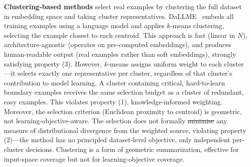 \documentclass[12pt, a4paper, twoside]{book}
\makeatletter
\numberwithin{equation}{chapter}
\theoremstyle{plain}
\theoremstyle{definition}
\theoremstyle{remark}
\newenvironment{foldable}{}{}
\providecommand{\DIFaddtex}[1]{{\protect\color{blue}\uwave{#1}}} %
\providecommand{\DIFdeltex}[1]{{\protect\color{red}\sout{#1}}} %
\providecommand{\DIFaddbegin}{} %
\providecommand{\DIFaddend}{} %
\providecommand{\DIFdelbegin}{} %
\providecommand{\DIFdelend}{} %
\providecommand{\DIFadd}[1]{\texorpdfstring{\DIFaddtex{#1}}{#1}} %
\providecommand{\DIFdel}[1]{\texorpdfstring{\DIFdeltex{#1}}{}} %
\newcommand{\DIFscaledelfig}{0.5}
\newlength{\DIFdelgraphicswidth} %
\newlength{\DIFdelgraphicsheight} %
\newcommand{\DIFaddincludegraphics}[2][]{{\color{blue}\fbox{\DIFOincludegraphics[#1]{#2}}}} %
\newcommand{\DIFdelincludegraphics}[2][]{%
\sbox{\DIFdelgraphicsbox}{\DIFOincludegraphics[#1]{#2}}%
\settoboxwidth{\DIFdelgraphicswidth}{\DIFdelgraphicsbox} %
\settoboxtotalheight{\DIFdelgraphicsheight}{\DIFdelgraphicsbox} %
\scalebox{\DIFscaledelfig}{%
\parbox[b]{\DIFdelgraphicswidth}{\usebox{\DIFdelgraphicsbox}\\[-\baselineskip] \rule{\DIFdelgraphicswidth}{0em}}\llap{\resizebox{\DIFdelgraphicswidth}{\DIFdelgraphicsheight}{%
\setlength{\unitlength}{\DIFdelgraphicswidth}%
\begin{picture}(1,1)%
\thicklines\linethickness{2pt} %
{\color[rgb]{1,0,0}\put(0,0){\framebox(1,1){}}}%
{\color[rgb]{1,0,0}\put(0,0){\line( 1,1){1}}}%
{\color[rgb]{1,0,0}\put(0,1){\line(1,-1){1}}}%
\end{picture}%
}\hspace*{3pt}}} %
} %
\DeclareRobustCommand{\DIFaddbegin}{\DIFOaddbegin \let\includegraphics\DIFaddincludegraphics} %
\DeclareRobustCommand{\DIFaddend}{\DIFOaddend \let\includegraphics\DIFOincludegraphics} %
\DeclareRobustCommand{\DIFdelbegin}{\DIFOdelbegin \let\includegraphics\DIFdelincludegraphics} %
\DeclareRobustCommand{\DIFdelend}{\DIFOaddend \let\includegraphics\DIFOincludegraphics} %
\let\sout@orig\sout %
\renewcommand{\sout}[1]{\ifmmode\text{\sout@orig{\ensuremath{#1}}}\else\sout@orig{#1}\fi} %
\makeatother
\begin{document}
\begin{foldable}
  \textbf{Clustering-based methods} select real examples by clustering the full dataset in embedding space and taking cluster representatives.
  DaLLME~\cite{tao2024textual} embeds all training examples using a language model and applies $k$-means clustering, selecting the example closest to each centroid.
  This approach is fast (linear in $N$), architecture-agnostic (operates on pre-computed embeddings), and produces human-readable output (real examples rather than soft embeddings), strongly satisfying property (3).
  However, $k$-means assigns uniform weight to each cluster---it selects exactly one representative per cluster, regardless of that cluster's contribution to model learning.
  A cluster containing critical, hard-to-learn boundary examples receives the same selection budget as a cluster of redundant, easy examples.
  This violates property (1), knowledge-informed weighting.
  Moreover, the selection criterion (Euclidean proximity to centroid) is geometric, not learning-objective-aware.
  The selection does not formally \DIFdelbegin \DIFdel{minimise }\DIFdelend \DIFaddbegin \DIFadd{minimize }\DIFaddend any measure of distributional divergence from the weighted source, violating property (2)---the method has no principled dataset-level objective, only independent per-cluster decisions.
  Clustering is a form of geometric summarization, effective for input-space coverage but not for learning-objective coverage.
\end{foldable}
\end{document}

